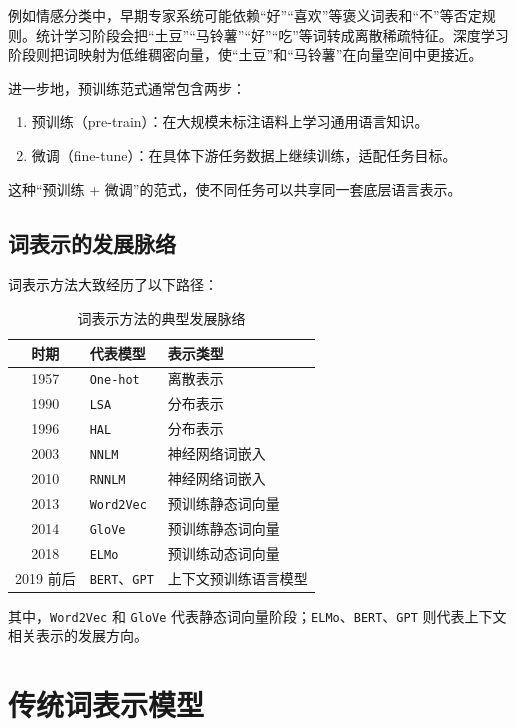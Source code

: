 例如情感分类中，早期专家系统可能依赖“好”“喜欢”等褒义词表和“不”等否定规则。统计学习阶段会把“土豆”“马铃薯”“好”“吃”等词转成离散稀疏特征。深度学习阶段则把词映射为低维稠密向量，使“土豆”和“马铃薯”在向量空间中更接近。

进一步地，预训练范式通常包含两步：
\begin{enumerate}
  \item 预训练（pre-train）：在大规模未标注语料上学习通用语言知识。
  \item 微调（fine-tune）：在具体下游任务数据上继续训练，适配任务目标。
\end{enumerate}

这种“预训练 + 微调”的范式，使不同任务可以共享同一套底层语言表示。

\subsection{词表示的发展脉络}

词表示方法大致经历了以下路径：

\begin{table}[H]
\centering
\small
\begin{tabular}{|c|p{}|p{}|}
\hline
时期 & 代表模型 & 表示类型 \\ \hline
1957 & \texttt{One-hot} & 离散表示 \\ \hline
1990 & \texttt{LSA} & 分布表示 \\ \hline
1996 & \texttt{HAL} & 分布表示 \\ \hline
2003 & \texttt{NNLM} & 神经网络词嵌入 \\ \hline
2010 & \texttt{RNNLM} & 神经网络词嵌入 \\ \hline
2013 & \texttt{Word2Vec} & 预训练静态词向量 \\ \hline
2014 & \texttt{GloVe} & 预训练静态词向量 \\ \hline
2018 & \texttt{ELMo} & 预训练动态词向量 \\ \hline
2019 前后 & \texttt{BERT}、\texttt{GPT} & 上下文预训练语言模型 \\ \hline
\end{tabular}
\caption{词表示方法的典型发展脉络}
\end{table}

其中，\texttt{Word2Vec} 和 \texttt{GloVe} 代表静态词向量阶段；\texttt{ELMo}、\texttt{BERT}、\texttt{GPT} 则代表上下文相关表示的发展方向。

\section{传统词表示模型}

